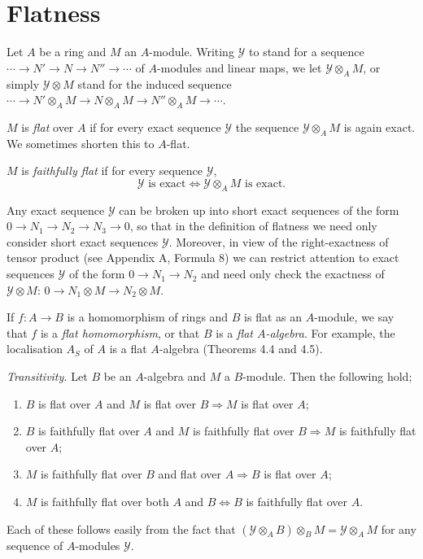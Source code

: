 \section{Flatness}\label{sec:7}

Let $A$ be a ring and $M$ an $A$-module. Writing $\mathcal{Y}$ to stand for a
sequence $\cdots \to N' \to N \to N'' \to \cdots$ of $A$-modules and linear
maps, we let $\mathcal{Y} \otimes_A M$, or simply $\mathcal{Y} \otimes M$ stand for the induced sequence $\cdots
\to N' \otimes_A M \to N \otimes_A M \to N'' \otimes_A M \to \cdots$.

\begin{definition}
$M$ is \emph{flat} over $A$ if for every exact sequence $\mathcal{Y}$ the sequence
$\mathcal{Y} \otimes_A M$ is again exact. We sometimes shorten this to $A$-flat.

$M$ is \emph{faithfully flat} if for every sequence $\mathcal{Y}$,
\[
  \mathcal{Y} \text{ is exact} \iff \mathcal{Y} \otimes_A M \text{ is exact}.
\]
\end{definition}

Any exact sequence $\mathcal{Y}$ can be broken up into short exact sequences of
the form $0 \to N_1 \to N_2 \to N_3 \to 0$, so that in the definition of flatness
we need only consider short exact sequences $\mathcal{Y}$. Moreover, in view of the
right-exactness of tensor product (see Appendix A, Formula 8) we can
restrict attention to exact sequences $\mathcal{Y}$ of the form $0 \to N_1 \to N_2$ and
need only check the exactness of $\mathcal{Y} \otimes M$: $0 \to N_1 \otimes M \to N_2 \otimes M$.

If $f\colon A \to B$ is a homomorphism of rings and $B$ is flat as an $A$-module,
we say that $f$ is a \emph{flat homomorphism}, or that $B$ is a \emph{flat $A$-algebra}. For
example, the localisation $A_S$ of $A$ is a flat $A$-algebra (Theorems 4.4 and 4.5).

\emph{Transitivity.} Let $B$ be an $A$-algebra and $M$ a $B$-module. Then the following
hold;
\begin{enumerate}[(1)]
  \item $B$ is flat over $A$ and $M$ is flat over $B \Rightarrow M$ is flat over $A$;
  \item $B$ is faithfully flat over $A$ and $M$ is faithfully flat over $B \Rightarrow M$ is
        faithfully flat over $A$;
  \item $M$ is faithfully flat over $B$ and flat over $A \Rightarrow B$ is flat over $A$;
  \item $M$ is faithfully flat over both $A$ and $B \iff B$ is faithfully flat over $A$.
\end{enumerate}
Each of these follows easily from the fact that $(\mathcal{Y} \otimes_A B) \otimes_B M = \mathcal{Y} \otimes_A M$ for
any sequence of $A$-modules $\mathcal{Y}$.

